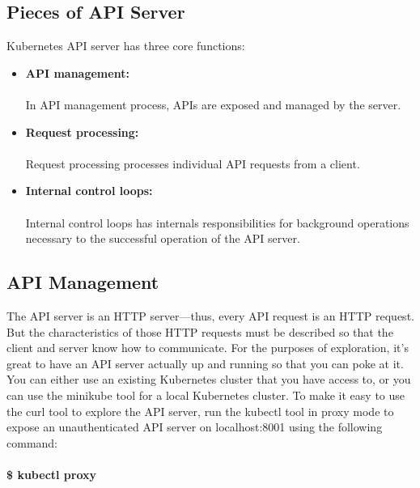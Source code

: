 \documentclass[12pt]{report}
\begin{document}
\subsection{Pieces of API Server}
Kubernetes API server has three core functions:
\begin{itemize}
	\item \textbf{API management:}\\\\
	In API management process, APIs are exposed and managed by the server.
	\item \textbf{Request processing:}\\\\
	Request processing processes individual API requests from a client.
	\item \textbf{Internal control loops:}\\\\
	Internal control loops has internals responsibilities for background operations necessary to the successful operation of the API server.
\end{itemize}
\subsection{API Management \cite{KubernetesManagement}}
The API server is an HTTP server—thus, every API request is an HTTP request. But the characteristics of those HTTP requests must be described so that the client and server know how to communicate. For the purposes of exploration, it’s great to have an API server actually up and running so that you can poke at it. You can either use an existing Kubernetes cluster that you have access to, or you can use the minikube tool for a local Kubernetes cluster. To make it easy to use the curl tool to explore the API server, run the kubectl tool in proxy mode to expose an unauthenticated API server on localhost:8001 using the following command:\\\\
\textbf{\$ kubectl proxy}
\end{document}
